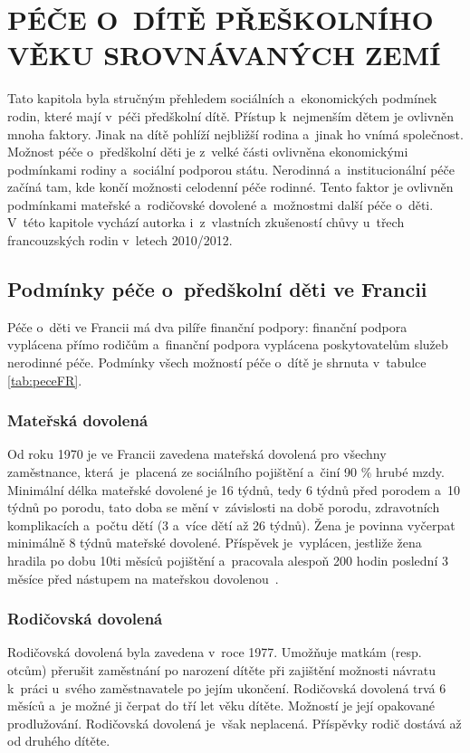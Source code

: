 \chapter[PÉČE O~DÍTĚ PŘEŠKOLNÍHO VĚKU\\ SROVNÁVANÝCH ZEMÍ]{PÉČE O~DÍTĚ PŘEŠKOLNÍHO VĚKU SROVNÁVANÝCH ZEMÍ}

	Tato kapitola byla stručným přehledem sociálních a~ekonomických podmínek rodin, které mají v péči předškolní dítě. Přístup k nejmenším dětem je ovlivněn mnoha faktory. Jinak na dítě pohlíží nejbližší rodina a~jinak ho vnímá společnost. Možnost péče o~předškolní děti je z velké části ovlivněna ekonomickými podmínkami rodiny a~sociální podporou státu. Nerodinná a~institucionální péče začíná tam, kde končí možnosti celodenní péče rodinné. Tento faktor je ovlivněn podmínkami mateřské a~rodičovské dovolené a~možnostmi další péče o~děti. V~této kapitole vychází autorka i~z~vlastních zkušeností chůvy u~třech francouzských rodin v~letech 2010/2012.

		\section{Podmínky péče o~předškolní děti ve Francii}
		Péče o~děti ve Francii má dva pilíře finanční podpory: finanční podpora vyplácena přímo rodičům a~finanční podpora vyplácena poskytovatelům služeb nerodinné péče. Podmínky všech možností péče o~dítě je shrnuta v~tabulce \ref{tab:peceFR}.


			\subsection{Mateřská dovolená}
				Od roku 1970 je ve Francii zavedena mateřská dovolená pro všechny zaměstnance, která je placená ze sociálního pojištění a~činí 90 \% hrubé mzdy. Minimální délka mateřské dovolené je 16 týdnů, tedy 6 týdnů před porodem a~10 týdnů po porodu, tato doba se mění v závislosti na době porodu, zdravotních komplikacích a~počtu dětí (3 a~více dětí až 26 týdnů). Žena je povinna vyčerpat minimálně 8 týdnů mateřské dovolené. Příspěvek je vyplácen, jestliže žena hradila po dobu 10ti měsíců pojištění a~pracovala alespoň 200 hodin poslední 3 měsíce před nástupem na mateřskou dovolenou~\citep{Dennipece}.

			\subsection{Rodičovská dovolená}
				Rodičovská dovolená byla zavedena v roce 1977. Umožňuje matkám (resp. otcům) přerušit zaměstnání po narození dítěte při zajištění možnosti návratu k práci u~svého zaměstnavatele po jejím ukončení. Rodičovská dovolená trvá 6 měsíců a~je možné ji čerpat do tří let věku dítěte. Možností je její opakované prodlužování. Rodičovská dovolená je však neplacená. Příspěvky rodič dostává až od druhého dítěte. 

